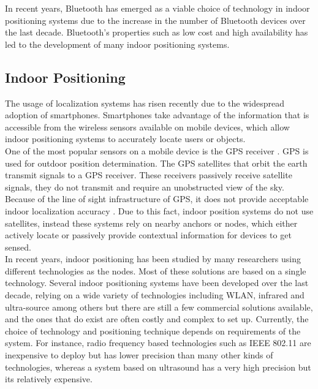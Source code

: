 \documentclass[12pt]{article}
\begin{document}
In recent years, Bluetooth has emerged as a viable choice of technology in indoor positioning systems due to the increase in the number of Bluetooth devices over the last decade. Bluetooth's properties such as low cost and high availability has led to the development of many indoor positioning systems. 

\subsection{Indoor Positioning}
The usage of localization systems has risen recently due to the widespread adoption of smartphones. Smartphones take advantage of the information that is accessible from the wireless sensors available on mobile devices, which allow indoor positioning systems to accurately locate users or objects. \\

One of the most popular sensors on a mobile device is the GPS receiver \cite{HABITS}. GPS is used for outdoor position determination. The GPS satellites that orbit the earth transmit signals to a GPS receiver. These receivers passively receive satellite signals, they do not transmit and require an unobstructed view of the sky. \cite{active-passive} Because of the line of sight infrastructure of GPS, it does not provide acceptable indoor localization accuracy \cite{fusionmethod}. Due to this fact, indoor position systems do not use satellites, instead these systems rely on nearby anchors or nodes, which either actively locate or passively provide contextual information for devices to get sensed. \\

In recent years, indoor positioning has been studied by many researchers using different technologies as the nodes. Most of these solutions are based on a single technology. Several indoor positioning systems have been developed over the last decade, relying on a wide variety of technologies including WLAN, infrared and ultra-source among others but there are still a few commercial solutions available, and the ones that do exist are often costly and complex to set up. Currently, the choice of technology and positioning technique depends on requirements of the system. For instance, radio frequency based technologies such as IEEE 802.11 are inexpensive to deploy but has lower precision than many other kinds of technologies, whereas a system based on ultrasound has a very high precision but its relatively expensive. \cite{bluetooth-master-thesis}\\
\end{document}
